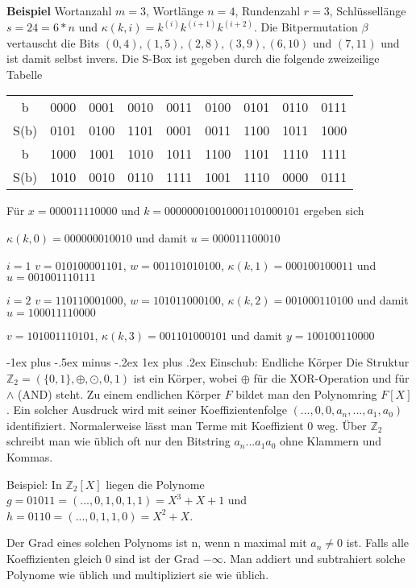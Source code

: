\documentclass[a4paper]{article}
\makeatletter
\renewcommand{\subsubsection}{\@startsection{subsubsection}{3}{0mm}%
 {-1ex plus -.5ex minus -.2ex}%
 {1ex plus .2ex}%
 {\normalfont\small\bfseries}}
\makeatother
\begin{document}
\begin{multicols}{3}
    \textbf{Beispiel} Wortanzahl $m=3$, Wortlänge $n=4$, Rundenzahl $r=3$, Schlüssellänge $s=24=6*n$ und $\kappa (k,i)=k^{(i)}k^{(i+1)}k^{(i+2)}$. Die Bitpermutation $\beta$ vertauscht die Bits $(0,4),(1,5),(2,8),(3,9),(6,10)$ und $(7,11)$ und ist damit selbst invers. Die S-Box ist gegeben durch die folgende zweizeilige Tabelle
    \begin{tabular}{c|c|c|c|c|c|c|c|c}
        b    & 0000 & 0001 & 0010 & 0011 & 0100 & 0101 & 0110 & 0111 \\
        S(b) & 0101 & 0100 & 1101 & 0001 & 0011 & 1100 & 1011 & 1000 \\\hline
        b    & 1000 & 1001 & 1010 & 1011 & 1100 & 1101 & 1110 & 1111 \\
        S(b) & 1010 & 0010 & 0110 & 1111 & 1001 & 1110 & 0000 & 0111
    \end{tabular}
    Für $x= 0000 1111 0000$ und $k=0000 0001 0010 0011 0100 0101$ ergeben sich
    \begin{enumerate*}
        \item $\kappa (k,0) = 0000 0001 0010$ und damit $u= 0000 1110 0010$
        \item $i=1$ $v=0101 0000 1101$, $w=0011 0101 0100$, $\kappa (k,1) = 0001 0010 0011$ und $u=0010 0111 0111$
        \item $i=2$ $v=1101 1000 1000$, $w=1010 1100 0100$, $\kappa (k,2) = 0010 0011 0100$ und damit $u= 1000 1111 0000$
        \item $v=1010 0111 0101$, $\kappa (k,3) = 0011 0100 0101$ und damit $y=1001 0011 0000$
    \end{enumerate*}

    \subsubsection{Einschub: Endliche Körper}
    Die Struktur $\mathbb{Z}_2=(\{0,1\},\oplus,\odot, 0 ,1)$ ist ein Körper, wobei $\oplus$ für die XOR-Operation und für $\wedge$ (AND) steht.
    Zu einem endlichen Körper $F$ bildet man den Polynomring $F[X]$. Ein solcher Ausdruck wird mit seiner Koeffizientenfolge $(...,0,0,a_n,...,a_1,a_0)$ identifiziert. Normalerweise lässt man Terme mit Koeffizient 0 weg. Über $\mathbb{Z}_2$ schreibt man wie üblich oft nur den Bitstring $a_n...a_1a_0$ ohne Klammern und Kommas.

    Beispiel: In $\mathbb{Z}_2[X]$ liegen die Polynome $g=01011=(..., 0 , 1 , 0 , 1 ,1) =X^3 +X+1$ und $h=0110=(..., 0 , 1 , 1 ,0) =X^2 +X$.

    Der Grad eines solchen Polynoms ist n, wenn n maximal mit $a_n\not = 0$ ist. Falls alle Koeffizienten gleich 0 sind  ist der Grad $-\infty$. Man addiert und subtrahiert solche Polynome wie üblich und multipliziert sie wie üblich.


\end{multicols}
\end{document}
